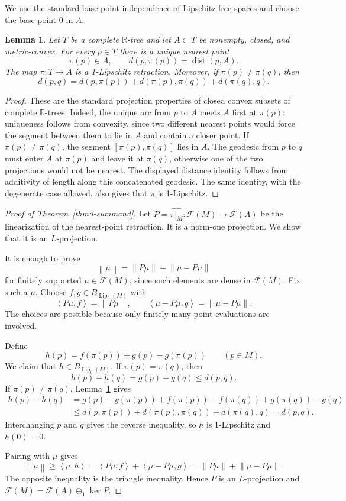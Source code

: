 \documentclass[11pt]{article}
\newtheorem{lemma}[theorem]{Lemma}
\theoremstyle{definition}
\theoremstyle{remark}
\newcommand{\R}{\mathbb R}
\newcommand{\F}{\mathcal F}
\newcommand{\Lip}{\operatorname{Lip}_0}
\newcommand{\dist}{\operatorname{dist}}
\newcommand{\norm}[1]{\left\lVert #1 \right\rVert}
\newcommand{\ip}[2]{\left\langle #1,#2 \right\rangle}
\begin{document}
We use the standard base-point independence of Lipschitz-free spaces and
choose the base point $0$ in $A$.

\begin{lemma}\label{lem:projection}
Let $T$ be a complete $\R$-tree and let $A\subset T$ be nonempty, closed, and
metric-convex.  For every $p\in T$ there is a unique nearest point
\[
  \pi(p)\in A,\qquad d(p,\pi(p))=\dist(p,A).
\]
The map $\pi:T\to A$ is a 1-Lipschitz retraction.  Moreover, if
$\pi(p)\ne \pi(q)$, then
\[
  d(p,q)=d(p,\pi(p))+d(\pi(p),\pi(q))+d(\pi(q),q).
\]
\end{lemma}

\begin{proof}
These are the standard projection properties of closed convex subsets of
complete $\R$-trees.  Indeed, the unique arc from $p$ to $A$ meets $A$ first
at $\pi(p)$; uniqueness follows from convexity, since two different nearest
points would force the segment between them to lie in $A$ and contain a
closer point.  If $\pi(p)\ne\pi(q)$, the segment
$[\pi(p),\pi(q)]$ lies in $A$.  The geodesic from $p$ to $q$ must enter $A$ at
$\pi(p)$ and leave it at $\pi(q)$, otherwise one of the two projections would
not be nearest.  The displayed distance identity follows from additivity of
length along this concatenated geodesic.  The same identity, with the
degenerate case allowed, also gives that $\pi$ is 1-Lipschitz.
\end{proof}

\begin{proof}[Proof of Theorem~\ref{thm:l-summand}]
Let $P=\widehat{\pi|_M}:\F(M)\to\F(A)$ be the linearization of the
nearest-point retraction.  It is a norm-one projection.  We show that it is an
$L$-projection.

It is enough to prove
\[
  \norm{\mu}=\norm{P\mu}+\norm{\mu-P\mu}
\]
for finitely supported $\mu\in\F(M)$, since such elements are dense in
$\F(M)$.  Fix such a $\mu$.  Choose $f,g\in B_{\Lip(M)}$ with
\[
  \ip{P\mu}{f}=\norm{P\mu},
  \qquad
  \ip{\mu-P\mu}{g}=\norm{\mu-P\mu}.
\]
The choices are possible because only finitely many point evaluations are
involved.

Define
\[
  h(p)=f(\pi(p))+g(p)-g(\pi(p))\qquad(p\in M).
\]
We claim that $h\in B_{\Lip(M)}$.  If $\pi(p)=\pi(q)$, then
\[
  h(p)-h(q)=g(p)-g(q)\le d(p,q).
\]
If $\pi(p)\ne\pi(q)$, Lemma~\ref{lem:projection} gives
\begin{align*}
  h(p)-h(q)
  &=
  g(p)-g(\pi(p))
  +f(\pi(p))-f(\pi(q))
  +g(\pi(q))-g(q)\\
  &\le
  d(p,\pi(p))+d(\pi(p),\pi(q))+d(\pi(q),q)
  =d(p,q).
\end{align*}
Interchanging $p$ and $q$ gives the reverse inequality, so $h$ is
1-Lipschitz and $h(0)=0$.

Pairing with $\mu$ gives
\[
  \norm{\mu}
  \ge \ip{\mu}{h}
  =
  \ip{P\mu}{f}+\ip{\mu-P\mu}{g}
  =
  \norm{P\mu}+\norm{\mu-P\mu}.
\]
The opposite inequality is the triangle inequality.  Hence $P$ is an
$L$-projection and $\F(M)=\F(A)\oplus_1\ker P$.
\end{proof}
\end{document}
